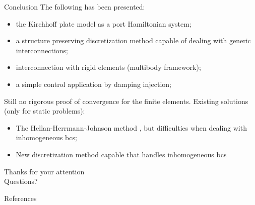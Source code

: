 \documentclass[aspectratio=169]{ISAE-Beamer}
\begin{document}
\begin{frame}{Conclusion}
The following has been presented:
	\begin{itemize}
		\item the Kirchhoff plate model as a port Hamiltonian system;
		\item a structure preserving discretization method capable of dealing with generic interconnections;
		\item interconnection with rigid elements (multibody framework);
		\item a simple control application by damping injection;
	\end{itemize}
Still no rigorous proof of convergence for the finite elements. Existing solutions (only for static problems):
\begin{itemize}
	\item The Hellan-Herrmann-Johnson  method , but difficulties when dealing with inhomogeneous bcs;
	\item New discretization method capable that handles inhomogeneous bcs 
\end{itemize}
\end{frame}


\begin{frame}{}
\centering
\Huge Thanks for your attention \\
\Huge Questions?
\end{frame}

\begin{frame}[allowframebreaks]{References}
\printbibliography
\nocite{*}
\end{frame}
\end{document}
